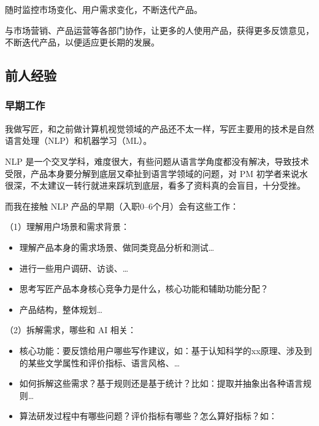 \documentclass[letterpaper,10pt,english]{sphinxmanual}
\begin{document}
随时监控市场变化、用户需求变化，不断迭代产品。

与市场营销、产品运营等各部门协作，让更多的人使用产品，获得更多反馈意见，不断迭代产品，以便适应更长期的发展。


\subsection{前人经验}
\label{\detokenize{chapter_experience/index:chap-exper}}\label{\detokenize{chapter_experience/index:id1}}\label{\detokenize{chapter_experience/index::doc}}

\subsubsection{早期工作}
\label{\detokenize{chapter_experience/early_phase:id1}}\label{\detokenize{chapter_experience/early_phase::doc}}
我做写匠，和之前做计算机视觉领域的产品还不太一样，写匠主要用的技术是自然语言处理（NLP）和机器学习（ML）。%
\begin{footnote}[688]\sphinxAtStartFootnote
{}
%
\end{footnote}
NLP
是一个交叉学科，难度很大，有些问题从语言学角度都没有解决，导致技术受限，产品本身要分解到底层又牵扯到语言学领域的问题，对
PM
初学者来说水很深，不太建议一转行就进来踩坑到底层，看多了资料真的会盲目，十分受挫。

而我在接触 NLP 产品的早期（入职0–6个月）会有这些工作：

（1）理解用户场景和需求背景：
\begin{itemize}
\item {} 
理解产品本身的需求场景、做同类竞品分析和测试…

\item {} 
进行一些用户调研、访谈、…

\item {} 
思考写匠产品本身核心竞争力是什么，核心功能和辅助功能分配？

\item {} 
产品结构，整体规划…

\end{itemize}

（2）拆解需求，哪些和 AI 相关：
\begin{itemize}
\item {} 
核心功能：要反馈给用户哪些写作建议，如：基于认知科学的xx原理、涉及到的某些文学属性和评价指标、语言风格、…

\item {} 
如何拆解这些需求？基于规则还是基于统计？比如：提取并抽象出各种语言规则…

\item {} 
算法研发过程中有哪些问题？评价指标有哪些？怎么算好指标？如：

\end{itemize}
\end{document}
